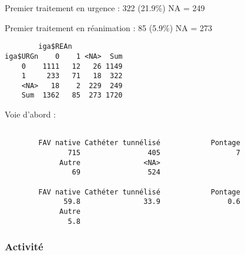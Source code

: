 \documentclass[11pt,a4paper]{article}\usepackage[]{graphicx}\usepackage[]{color}
\makeatletter
\newenvironment{kframe}{%
 \def\at@end@of@kframe{}%
 \ifinner\ifhmode%
  \def\at@end@of@kframe{\end{minipage}}%
  \begin{minipage}{\columnwidth}%
 \fi\fi%
 \def\FrameCommand##1{\hskip\@totalleftmargin \hskip-\fboxsep
 \colorbox{shadecolor}{##1}\hskip-\fboxsep
     \hskip-\linewidth \hskip-\@totalleftmargin \hskip\columnwidth}%
 \MakeFramed {\advance\hsize-\width
   \@totalleftmargin\z@ \linewidth\hsize
   \@setminipage}}%
 {\par\unskip\endMakeFramed%
 \at@end@of@kframe}
\newenvironment{knitrout}{}{} %
\makeatother
\begin{document}
Premier traitement en urgence :  322 (21.9\%) NA = 249

Premier traitement en réanimation :  85 (5.9\%) NA = 273

\begin{knitrout}
\color{fgcolor}\begin{kframe}
\begin{verbatim}
        iga$REAn
iga$URGn    0    1 <NA>  Sum
    0    1111   12   26 1149
    1     233   71   18  322
    <NA>   18    2  229  249
    Sum  1362   85  273 1720
\end{verbatim}
\end{kframe}
\end{knitrout}

Voie d’abord :
\begin{knitrout}
\color{fgcolor}\begin{kframe}
\begin{verbatim}

        FAV native Cathéter tunnélisé            Pontage 
               715                405                  7 
             Autre               <NA> 
                69                524 

        FAV native Cathéter tunnélisé            Pontage 
              59.8               33.9                0.6 
             Autre 
               5.8 
\end{verbatim}
\end{kframe}
\end{knitrout}

    \subsubsection{Activité}
\end{document}
